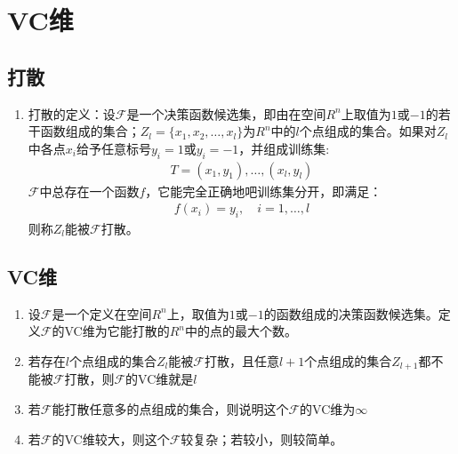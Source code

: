\section{VC维}
\subsection{打散}
\begin{enumerate}
	\item 打散的定义：设$\mathcal{F}$是一个决策函数候选集，即由在空间$R^n$上取值为$1$或$-1$的若干函数组成的集合；$Z_l=\{x_1, x_2, \dots, x_l\}$为$R^n$中的$l$个点组成的集合。如果对$Z_l$中各点$x_i$给予任意标号$y_i=1$或$y_i=-1$，并组成训练集:
	\begin{align}
		T = {(x_1, y_1), \dots, (x_l, y_l)}
	\end{align}
	$\mathcal{F}$中总存在一个函数$f$，它能完全正确地吧训练集分开，即满足：
	\begin{align}
		f(x_i) = y_i, \quad i = 1,\dots, l
	\end{align}
	则称$Z_l$能被$\mathcal{F}$打散。
\end{enumerate}


\subsection{VC维}
\begin{enumerate}
	\item 设$\mathcal{F}$是一个定义在空间$R^n$上，取值为$1$或$-1$的函数组成的决策函数候选集。定义$\mathcal{F}$的VC维为它能打散的$R^n$中的点的最大个数。
	\item 若存在$l$个点组成的集合$Z_l$能被$\mathcal{F}$打散，且任意$l+1$个点组成的集合$Z_{l+1}$都不能被$\mathcal{F}$打散，则$\mathcal{F}$的VC维就是$l$
	\item 若$\mathcal{F}$能打散任意多的点组成的集合，则说明这个$\mathcal{F}$的VC维为$\infty$
	\item 若$\mathcal{F}$的VC维较大，则这个$\mathcal{F}$较复杂；若较小，则较简单。

\end{enumerate}
{\color{red}{对VC维的理解还有待提高，待后续比较懂了再补充}}





































